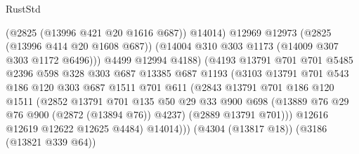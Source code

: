 \begin{lexlean}{RustStd}
\begin{coremodule}
                                      (@2825 (@13996 @421 @20 @1616 @687))
                                      @14014)
                                    @12969
                                    @12973
                                    (@2825 (@13996 @414 @20 @1608 @687))
                                    (@14004 @310 @303 @1173 (@14009 @307 @303 @1172 @6496)))
                                  @4499
                                  @12994
                                  @4188)
                                (@4193
                                  @13791
                                  @701
                                  @701
                                  @5485
                                  @2396
                                  @598
                                  @328
                                  @303
                                  @687
                                  @13385
                                  @687
                                  @1193
                                  (@3103
                                    @13791
                                    @701
                                    @543
                                    @186
                                    @120
                                    @303
                                    @687
                                    @1511
                                    @701
                                    @611
                                    (@2843
                                      @13791
                                      @701
                                      @186
                                      @120
                                      @1511
                                      (@2852
                                        @13791
                                        @701
                                        @135
                                        @50
                                        @29
                                        @33
                                        @900
                                        @698
                                        (@13889 @76 @29 @76 @900 (@2872 (@13894 @76)) @4237)
                                        (@2889 @13791 @701)))
                                    @12616
                                    @12619
                                    @12622
                                    @12625
                                    @4484)
                                  @14014)))
                            (@4304 (@13817 @18))
                            (@3186 (@13821 @339 @64))

\end{coremodule}
\end{lexlean}
